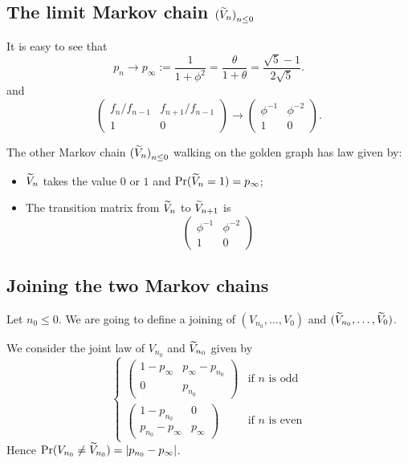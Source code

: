 \documentclass[12pt,a4paper]{article}
\begin{document}
\subsection{The limit Markov chain ${(\widetilde{V}_n)}_{n \leq 0}$}

It is easy to see that 
$$
p_n \to p_\infty := \frac{1}{1+\phi^2}= \frac{\theta}{1+\theta} = \frac{\sqrt{5}-1}{2\sqrt{5}}.
$$
and 
$$
\begin{pmatrix}
f_n/f_{n-1} & f_{n+1}/f_{n-1} \\
1 & 0
\end{pmatrix} 
\to \begin{pmatrix}
\phi^{-1} & \phi^{-2} \\
1 & 0
\end{pmatrix}. 
$$

The other Markov chain ${(\widetilde{V}_n)}_{n \leq 0}$ walking on the golden graph has law given by:

\begin{itemize}
\item $\widetilde{V}_n$ takes the value $0$ or $1$ and $\Pr(\widetilde{V}_n=1) = p_\infty$;

\item The transition matrix from $\widetilde{V}_{n}$ to $\widetilde{V}_{n+1}$ is 
$$
\begin{pmatrix}
\phi^{-1} & \phi^{-2} \\
1 & 0
\end{pmatrix}
$$
\end{itemize}


\subsection{Joining the two Markov chains}\label{sec:joiningVn}


Let $n_0 \leq 0$. We are going to define a joining of $(V_{n_0}, \ldots, V_0)$ and 
$(\widetilde{V}_{n_0}, \ldots, \widetilde{V}_0)$.

We consider the joint law of $V_{n_0}$ and $\widetilde{V}_{n_0}$ given by
$$
\begin{cases}
\begin{pmatrix} 
1-p_\infty &  p_\infty - p_{n_0} \\
0 & p_{n_0}
\end{pmatrix} & \text{if $n$ is odd} \\
\begin{pmatrix} 
1-p_{n_0}  &  0 \\
p_{n_0} - p_\infty  & p_\infty
\end{pmatrix} & \text{if $n$ is even}
\end{cases}
$$
Hence $\Pr(V_{n_0} \neq \widetilde{V}_{n_0}) = |p_{n_0}-p_\infty|$.
\end{document}
